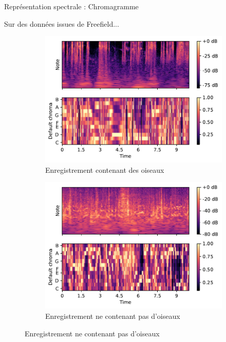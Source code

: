 \documentclass[compress,xcolor=table]{beamer}
\begin{document}
\begin{frame}{Représentation spectrale : Chromagramme}

    Sur des données issues de Freefield...

    \begin{figure}[ht]
        \centering
        \begin{subfigure}[b]{0.45\textwidth}
            \centering
            \includegraphics[width=\textwidth]{images/audio/birds.chromagram.ff1010.pdf}
            \caption{Enregistrement contenant des oiseaux}
            \label{fig:birds.chromagram.ff1010}
        \end{subfigure}
        \hfill
        \begin{subfigure}[b]{0.45\textwidth}
            \centering
            \includegraphics[width=\textwidth]{images/audio/nobirds.chromagram.ff1010.pdf}
            \caption{Enregistrement ne contenant pas d'oiseaux}
            \label{fig:nobirds.chromagram.ff1010}
        \end{subfigure}
    \end{figure}


\end{frame}
\end{document}
